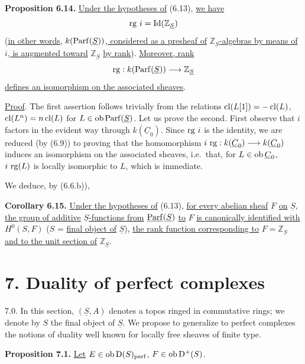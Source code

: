 \textbf{Proposition 6.14.} \uline{Under the hypotheses of} (6.13), \uline{we have}
\[
  \operatorname{rg}\, i=\operatorname{Id}(\mathbb Z_{\underline{S}})
\]
(\uline{in other words,} \(k(\operatorname{Parf}(\underline{S}))\)\uline{, considered as a presheaf of} \(\mathbb Z_{\underline{S}}\)\uline{-algebras by means of} \(i\)\uline{, is augmented toward} \(\mathbb Z_{\underline{S}}\) \uline{by rank}). \uline{Moreover, rank}
\[
  \operatorname{rg}:k(\operatorname{Parf}(\underline{S}))\longrightarrow\mathbb Z_{\underline{S}}
\]
\uline{defines an isomorphism on the associated sheaves}.

%
\uline{Proof}. The first assertion follows trivially from the relations \(\operatorname{cl}(L[1])=-\operatorname{cl}(L)\), \(\operatorname{cl}(L^n)=n\operatorname{cl}(L)\) for \(L\in\operatorname{ob}\operatorname{Parf}(\underline{S})\). Let us prove the second. First observe that \(i\) factors in the evident way through \(k(\underline{C}_0)\). Since \(\operatorname{rg}\, i\) is the identity, we are reduced (by (6.9)) to proving that the homomorphism \(i\, \operatorname{rg}:k(\underline{C}_0)\longrightarrow k(\underline{C}_0)\) induces an isomorphism on the associated sheaves, i.e.\ that, for \(L\in\operatorname{ob}\underline{C}_0\), \(i\, \operatorname{rg}(L)\) is locally isomorphic to \(L\), which is immediate.

We deduce, by (6.6.b)),

\textbf{Corollary 6.15.} \uline{Under the hypotheses of} (6.13), \uline{for every abelian sheaf} \(F\) \uline{on} \(\underline{S}\)\uline{, the group of additive} \(\underline{S}\)\uline{-functions from} \(\underline{\operatorname{Parf}}(\underline{S})\) \uline{to} \(F\) \uline{is canonically identified with} \(H^0(S,F)\) (\(S\) = \uline{final object of} \(\underline{S}\)), \uline{the rank function corresponding to} \(F=\mathbb Z_{\underline{S}}\) \uline{and to the unit section of} \(\mathbb Z_{\underline{S}}\).

\section*{7. Duality of perfect complexes}

7.0. In this section, \((\underline{S},A)\) denotes a topos ringed in commutative rings; we denote by \(S\) the final object of \(\underline{S}\). We propose to generalize to perfect complexes the notions of duality well known for locally free sheaves of finite type.

\textbf{Proposition 7.1.} \uline{Let} \(E\in\operatorname{ob}\mathrm D(S)_{\mathrm{parf}}\), \(F\in\operatorname{ob}\mathrm D^+(S)\).

